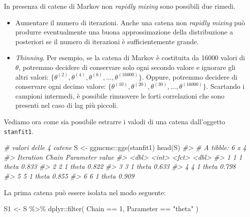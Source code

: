 \documentclass[
  11pt,
  italian,
  a4paper,
  extrafontsizes,onecolumn,openright
  ]{memoir}
\newenvironment{Shaded}{\begin{snugshade}}{\end{snugshade}}
\newcommand{\CommentTok}[1]{\textcolor[rgb]{0.56,0.35,0.01}{\textit{#1}}}
\newcommand{\DecValTok}[1]{\textcolor[rgb]{0.00,0.00,0.81}{#1}}
\newcommand{\FunctionTok}[1]{\textcolor[rgb]{0.00,0.00,0.00}{#1}}
\newcommand{\NormalTok}[1]{#1}
\newcommand{\OtherTok}[1]{\textcolor[rgb]{0.56,0.35,0.01}{#1}}
\newcommand{\SpecialCharTok}[1]{\textcolor[rgb]{0.00,0.00,0.00}{#1}}
\newcommand{\StringTok}[1]{\textcolor[rgb]{0.31,0.60,0.02}{#1}}
\providecommand{\tightlist}{%
  \setlength{\itemsep}{0pt}\setlength{\parskip}{0pt}}
\begin{document}
In presenza di catene di Markov non \emph{rapidly mixing} sono possibili due rimedi.

\begin{itemize}
\tightlist
\item
  Aumentare il numero di iterazioni. Anche una catena non \emph{rapidly mixing} può produrre eventualmente una buona approssimazione della distribuzione a posteriori se il numero di iterazioni è sufficientemente grande.
\item
  \emph{Thinning}. Per esempio, se la catena di Markov è costituita da 16000 valori di \(\theta\), potremmo decidere di conservare solo ogni secondo valore e ignorare gli altri valori: \(\{\theta^{(2)}, \theta^{(4)}, \theta^{(6)}, \dots, \theta^{(16000)}\}\). Oppure, potremmo decidere di conservare ogni decimo valore: \(\{\theta^{(10)}, \theta^{(20)}, \theta^{(30)}, \dots, \theta^{(16000)}\}\). Scartando i campioni intermedi, è possibile rimuovere le forti correlazioni che sono presenti nel caso di lag più piccoli.
\end{itemize}

Vediamo ora come sia possibile estrarre i valodi di una catena dall'oggetto \texttt{stanfit1}.

\begin{Shaded}
\begin{Highlighting}[]
\CommentTok{\# valori delle 4 catene}
\NormalTok{S }\OtherTok{\textless{}{-}}\NormalTok{ ggmcmc}\SpecialCharTok{::}\FunctionTok{ggs}\NormalTok{(stanfit1)}
\FunctionTok{head}\NormalTok{(S)}
\CommentTok{\#\textgreater{} \# A tibble: 6 x 4}
\CommentTok{\#\textgreater{}   Iteration Chain Parameter value}
\CommentTok{\#\textgreater{}       \textless{}dbl\textgreater{} \textless{}int\textgreater{} \textless{}fct\textgreater{}     \textless{}dbl\textgreater{}}
\CommentTok{\#\textgreater{} 1         1     1 theta     0.833}
\CommentTok{\#\textgreater{} 2         2     1 theta     0.822}
\CommentTok{\#\textgreater{} 3         3     1 theta     0.633}
\CommentTok{\#\textgreater{} 4         4     1 theta     0.798}
\CommentTok{\#\textgreater{} 5         5     1 theta     0.855}
\CommentTok{\#\textgreater{} 6         6     1 theta     0.909}
\end{Highlighting}
\end{Shaded}

\noindent
La prima catena può essere isolata nel modo seguente:

\begin{Shaded}
\begin{Highlighting}[]
\NormalTok{S1 }\OtherTok{\textless{}{-}}\NormalTok{ S }\SpecialCharTok{\%\textgreater{}\%}
\NormalTok{  dplyr}\SpecialCharTok{::}\FunctionTok{filter}\NormalTok{(}
\NormalTok{    Chain }\SpecialCharTok{==} \DecValTok{1}\NormalTok{,}
\NormalTok{    Parameter }\SpecialCharTok{==} \StringTok{"theta"}
\NormalTok{  )}
\end{Highlighting}
\end{Shaded}
\end{document}
